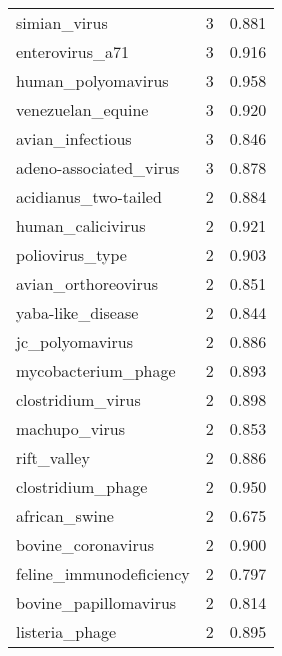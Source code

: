 \begin{tabular}{lrr}
                             simian\_virus &                   3 &     0.881 \\
                          enterovirus\_a71 &                   3 &     0.916 \\
                       human\_polyomavirus &                   3 &     0.958 \\
                        venezuelan\_equine &                   3 &     0.920 \\
                         avian\_infectious &                   3 &     0.846 \\
                   adeno-associated\_virus &                   3 &     0.878 \\
                     acidianus\_two-tailed &                   2 &     0.884 \\
                        human\_calicivirus &                   2 &     0.921 \\
                          poliovirus\_type &                   2 &     0.903 \\
                      avian\_orthoreovirus &                   2 &     0.851 \\
                        yaba-like\_disease &                   2 &     0.844 \\
                          jc\_polyomavirus &                   2 &     0.886 \\
                      mycobacterium\_phage &                   2 &     0.893 \\
                        clostridium\_virus &                   2 &     0.898 \\
                            machupo\_virus &                   2 &     0.853 \\
                              rift\_valley &                   2 &     0.886 \\
                        clostridium\_phage &                   2 &     0.950 \\
                            african\_swine &                   2 &     0.675 \\
                       bovine\_coronavirus &                   2 &     0.900 \\
                  feline\_immunodeficiency &                   2 &     0.797 \\
                    bovine\_papillomavirus &                   2 &     0.814 \\
                           listeria\_phage &                   2 &     0.895 \\

\end{tabular}
